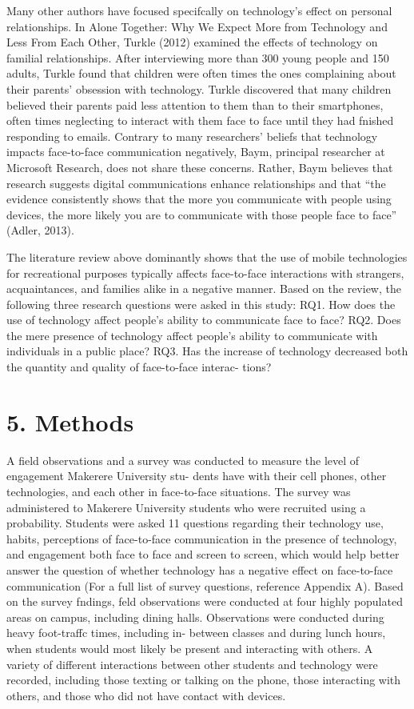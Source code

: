 \documentclass[11pt]{article} %
\begin{document}
Many other authors have focused specifcally on technology’s effect on personal relationships. In  
Alone Together: Why We Expect More from Technology and Less From Each Other,  Turkle (2012) examined 
the effects of technology on familial relationships. After interviewing more than 300 young people and 150 
adults, Turkle found that children were often times the ones complaining about their parents’ obsession with 
technology. Turkle discovered that many children believed their parents paid less attention to them than to 
their smartphones, often times neglecting to interact with them face to face until they had fnished responding 
to emails.
Contrary to many researchers’ beliefs that technology impacts face-to-face communication negatively, 
Baym, principal researcher at Microsoft Research, does not share these concerns. Rather, Baym believes 
that research suggests digital communications enhance relationships and that “the evidence consistently 
shows that the more you communicate with people using devices, the more likely you are to communicate 
with those people face to face” (Adler, 2013).

The literature review above dominantly shows that the use of mobile technologies for recreational purposes typically affects 
face-to-face interactions with strangers, acquaintances, and families alike in a negative manner. Based on the review, the following three research questions were asked in this study:
RQ1. How does the use of technology affect people’s ability to communicate face to face? 
RQ2. Does the mere presence of technology affect people’s ability to communicate with individuals in 
a public place?
RQ3. Has the increase of technology decreased both the quantity and quality of face-to-face interac-
tions?

\section{5. Methods}

A field observations and a survey was conducted to measure the level of engagement Makerere University stu-
dents have with their cell phones, other technologies, and each other in face-to-face situations. 
The survey was administered to Makerere University students who were recruited using a probability.
Students were asked 11 questions regarding their technology use, habits, perceptions of face-to-face communication in 
the presence of technology, and engagement both face to face and screen to screen, which would help better answer the question of whether technology has a negative effect on face-to-face communication (For a full list of survey questions, reference Appendix A).
Based on the survey fndings, feld observations were conducted at four highly populated areas on 
campus, including dining halls. Observations were conducted during heavy foot-traffc times, including in-
between classes and during lunch hours, when students would most likely be present and interacting with 
others. A variety of different interactions between other students and technology were recorded, including 
those texting or talking on the phone, those interacting with others, and those who did not have contact with 
devices. 
\end{document}
